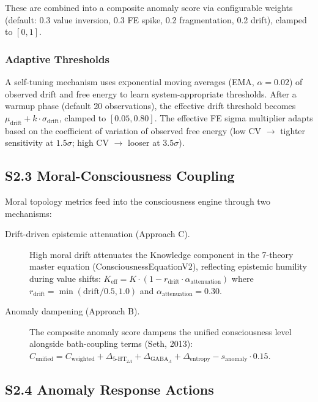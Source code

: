 \documentclass[10pt,landscape]{article}
\begin{document}
These are combined into a composite anomaly score via configurable weights (default: 0.3 value inversion, 0.3 FE spike, 0.2 fragmentation, 0.2 drift), clamped to $[0, 1]$.

\subsubsection*{Adaptive Thresholds}

A self-tuning mechanism uses exponential moving averages (EMA, $\alpha = 0.02$) of observed drift and free energy to learn system-appropriate thresholds.  After a warmup phase (default 20 observations), the effective drift threshold becomes $\mu_{\mathrm{drift}} + k \cdot \sigma_{\mathrm{drift}}$, clamped to $[0.05, 0.80]$.  The effective FE sigma multiplier adapts based on the coefficient of variation of observed free energy (low CV $\to$ tighter sensitivity at $1.5\sigma$; high CV $\to$ looser at $3.5\sigma$).

\subsection*{S2.3 Moral-Consciousness Coupling}

Moral topology metrics feed into the consciousness engine through two mechanisms:

\begin{description}
  \item[Drift-driven epistemic attenuation (Approach C).] High moral drift attenuates the \textsf{Knowledge} component in the 7-theory master equation (ConsciousnessEquationV2), reflecting epistemic humility during value shifts: $K_{\mathrm{eff}} = K \cdot (1 - r_{\mathrm{drift}} \cdot \alpha_{\mathrm{attenuation}})$ where $r_{\mathrm{drift}} = \min(\mathrm{drift} / 0.5, 1.0)$ and $\alpha_{\mathrm{attenuation}} = 0.30$.
  \item[Anomaly dampening (Approach B).] The composite anomaly score dampens the unified consciousness level alongside bath-coupling terms (Seth, 2013): $C_{\mathrm{unified}} = C_{\mathrm{weighted}} + \Delta_{\mathrm{5\text{-}HT}_{2A}} + \Delta_{\mathrm{GABA}_A} + \Delta_{\mathrm{entropy}} - s_{\mathrm{anomaly}} \cdot 0.15$.
\end{description}

\subsection*{S2.4 Anomaly Response Actions}
\end{document}
